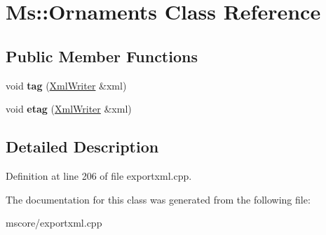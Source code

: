 \hypertarget{class_ms_1_1_ornaments}{}\section{Ms\+:\+:Ornaments Class Reference}
\label{class_ms_1_1_ornaments}
\subsection*{Public Member Functions}
\begin{DoxyCompactItemize}
\item 
\mbox{\label{class_ms_1_1_ornaments_a65e4213af550a832176a334163ae1361}} 
void {\bfseries tag} (\hyperlink{class_ms_1_1_xml_writer}{Xml\+Writer} \&xml)
\item 
\mbox{\label{class_ms_1_1_ornaments_a05c1c071f14bb9bcc2bd43d7e52fafb7}} 
void {\bfseries etag} (\hyperlink{class_ms_1_1_xml_writer}{Xml\+Writer} \&xml)
\end{DoxyCompactItemize}


\subsection{Detailed Description}


Definition at line 206 of file exportxml.\+cpp.



The documentation for this class was generated from the following file\+:\begin{DoxyCompactItemize}
\item 
mscore/exportxml.\+cpp\end{DoxyCompactItemize}
